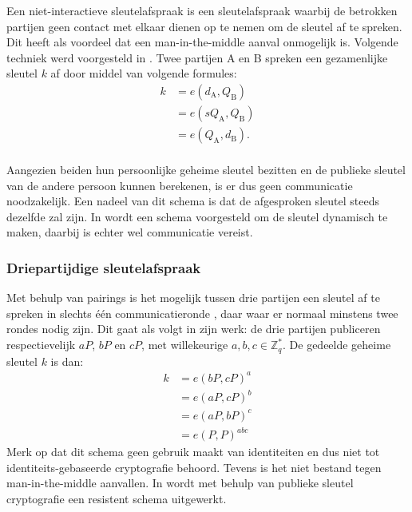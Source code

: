 Een niet-interactieve sleutelafspraak is een sleutelafspraak waarbij de betrokken partijen geen contact met elkaar dienen op te nemen om de sleutel af te spreken. Dit heeft als voordeel dat een man-in-the-middle aanval onmogelijk is. Volgende techniek werd voorgesteld in \cite{sakai}. Twee partijen A en B spreken een gezamenlijke sleutel $k$ af door middel van volgende formules:
\[\begin{aligned}
k	&= e(d_{\text{A}}, Q_{\text{B}})\\
	&= e(s Q_{\text{A}}, Q_{\text{B}})\\
	&= e(Q_{\text{A}}, d_{\text{B}}).\\
\end{aligned}\]

Aangezien beiden hun persoonlijke geheime sleutel bezitten en de publieke sleutel van de andere persoon kunnen berekenen, is er dus geen communicatie noodzakelijk. Een nadeel van dit schema is dat de afgesproken sleutel steeds dezelfde zal zijn. In \cite{smart} wordt een schema voorgesteld om de sleutel dynamisch te maken, daarbij is echter wel communicatie vereist.

\subsubsection{Driepartijdige sleutelafspraak}

Met behulp van pairings is het mogelijk tussen drie partijen een sleutel af te spreken in slechts \'e\'en communicatieronde \cite{joux}, daar waar er normaal minstens twee rondes nodig zijn. Dit gaat als volgt in zijn werk: de drie partijen publiceren respectievelijk $aP$, $bP$ en $cP$, met willekeurige $a, b, c \in \mathbb{Z}_q^*$. De gedeelde geheime sleutel $k$ is dan:
\[\begin{aligned}
k	&= e(bP, cP)^a\\
	&= e(aP, cP)^b\\
	&= e(aP, bP)^c\\
	&= e(P, P)^{abc}
\end{aligned}\]
Merk op dat dit schema geen gebruik maakt van identiteiten en dus niet tot identiteits-gebaseerde cryptografie behoord. Tevens is het niet bestand tegen man-in-the-middle aanvallen. In \cite{paterson} wordt met behulp van publieke sleutel cryptografie een resistent schema uitgewerkt.

